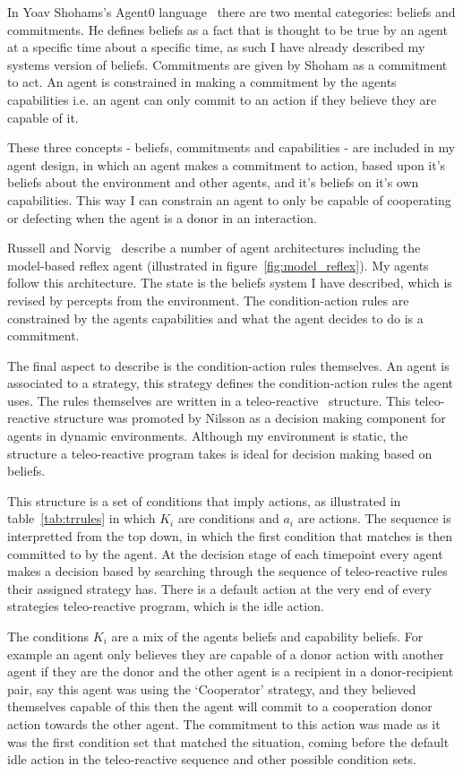 \documentclass[]{final_report}
\begin{document}
In Yoav Shohams's Agent0 language~\cite{shoham1991agent0} there are two mental categories: beliefs and commitments. He defines beliefs as a fact that is thought to be true by an agent at a specific time about a specific time, as such I have already described my systems version of beliefs. Commitments are given by Shoham as a commitment to act. An agent is constrained in making a commitment by the agents capabilities i.e. an agent can only commit to an action if they believe they are capable of it.\par 
These three concepts - beliefs, commitments and capabilities - are included in my agent design, in which an agent makes a commitment to action, based upon it's beliefs about the environment and other agents, and it's beliefs on it's own capabilities. This way I can constrain an agent to only be capable of cooperating or defecting when the agent is a donor in an interaction.\par
Russell and Norvig~\cite{russell2016artificial} describe a number of agent architectures including the model-based reflex agent (illustrated in figure~\ref{fig:model_reflex}). My agents follow this architecture. The state is the beliefs system I have described, which is revised by percepts from the environment. The condition-action rules are constrained by the agents capabilities and what the agent decides to do is a commitment.\par
The final aspect to describe is the condition-action rules themselves. An agent is associated to a strategy, this strategy defines the condition-action rules the agent uses. The rules themselves are written in a teleo-reactive~\cite{nilsson1993teleo} structure. This teleo-reactive structure was promoted by Nilsson as a decision making component for agents in dynamic environments. Although my environment is static, the structure a teleo-reactive program takes is ideal for decision making based on beliefs.\par
This structure is a set of conditions that imply actions, as illustrated in table~\ref{tab:trrules} in which $K_i$ are conditions and $a_i$ are actions. The sequence is interpretted from the top down, in which the first condition that matches is then committed to by the agent. At the decision stage of each timepoint every agent makes a decision based by searching through the sequence of teleo-reactive rules their assigned strategy has. There is a default action at the very end of every strategies teleo-reactive program, which is the idle action.\par
The conditions $K_i$ are a mix of the agents beliefs and capability beliefs. For example an agent only believes they are capable of a donor action with another agent if they are the donor and the other agent is a recipient in a donor-recipient pair, say this agent was using the `Cooperator' strategy, and they believed themselves capable of this then the agent will commit to a cooperation donor action towards the other agent. The commitment to this action was made as it was the first condition set that matched the situation, coming before the default idle action in the teleo-reactive sequence and other possible condition sets.\par
\end{document}
